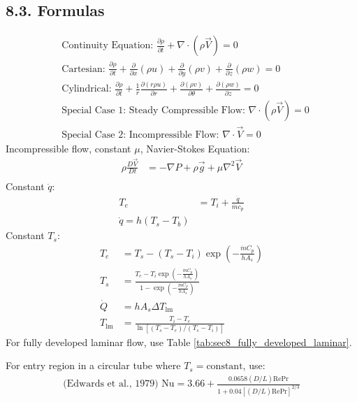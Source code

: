 \documentclass[10pt]{article}
\begin{document}
\begin{multicols*}{2}
\subsection*{8.3. Formulas}
\vspace{-0.4cm}
\begin{align*}
    &\text{Continuity Equation: } \frac{\partial \rho}{\partial t} + \nabla \cdot (\rho \vec{V}) = 0 \\
    &\text{Cartesian: } \frac{\partial \rho}{\partial t} + \frac{\partial}{\partial x}(\rho u) + \frac{\partial}{\partial y}(\rho v) 
    + \frac{\partial}{\partial z}(\rho w) = 0 \\
    &\text{Cylindrical: } \frac{\partial \rho}{\partial t} + \frac{1}{r} \frac{\partial(r \rho u)}{\partial r} + \frac{\partial(\rho v)}{\partial \theta} 
    + \frac{\partial(\rho w)}{\partial z} = 0 \\
    &\text{Special Case 1: Steady Compressible Flow: } \nabla \cdot (\rho \vec{V}) = 0 \\
    &\text{Special Case 2: Incompressible Flow: } \nabla \cdot \vec{V} = 0 
\end{align*}
Incompressible flow, constant $\mu$, Navier-Stokes Equation:
\vspace{-0.1cm}
\begin{align*}
    \rho \frac{ D \vec{V}}{D t}  &= -\nabla P + \rho \vec{g} + \mu \nabla^2 \vec{V} \\
\end{align*}
\vspace{-0.5cm}
Constant $\dot{q}$:
\begin{align*}
    T_e &= T_i + \frac{\dot{q}}{\dot{m} c_p} \\ 
    \dot{q} = h(T_s-T_b)
\end{align*}
Constant $T_s$:
\vspace{-0.5cm}
\begin{align*}
    T_e &= T_s - (T_s - T_i) \exp\left(-\frac{\dot{m} C_p}{h A_s}\right) \\
    T_s &=\frac{T_e - T_i \exp\left(-\frac{\dot{m} C_p}{h A_s}\right)}{1 - \exp\left(-\frac{\dot{m} C_p}{h A_s}\right)} \\
    \dot{Q} &= h A_s \Delta T_{\text{lm}} \\
    T_{\text{lm}} &= \frac{T_{i} - T_{e}}{\ln[(T_{s} - T_{e})/(T_{s} - T_{i})]} 
\end{align*}    
For fully developed laminar flow, use Table \ref{tab:sec8_fully_developed_laminar}.

For entry region in a circular tube where $T_s = \text{constant}$, use:
\vspace{-0.5cm}
\begin{align*}
    \text{(Edwards et al., 1979) } \text{Nu} = 3.66 + \frac{0.0658(D/L) \text{Re} \text{Pr}}{1 + 0.04[(D/L) \text{Re} \text{Pr}]^{2/3}} 
\end{align*}


\end{multicols*}
\end{document}
